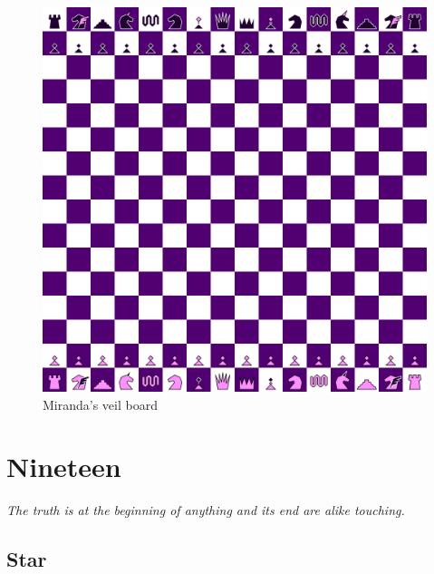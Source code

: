 \documentclass[a5paper,12pt,draft]{book} %
\begin{document}
\noindent
\begin{figure}[h]
\includegraphics[width=1.0\textwidth, keepaspectratio=true]{../gfx/boards/10_miranda_s_veil.png}
\caption{Miranda's veil board}
\label{fig:miranda_s_veil}
\end{figure}

\clearpage

\chapter*{Nineteen}

\begin{flushright}
\parbox{0.8\textwidth}{
\emph{The truth is at the beginning of anything and its end are alike touching. \\
 } }
\end{flushright}

\section*{Star}
\end{document}
